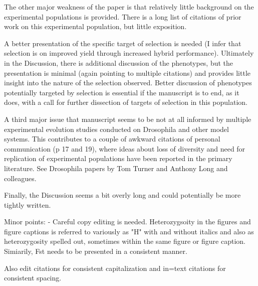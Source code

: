 \documentclass[onecolumn,oneside,letterpaper]{article}
\newcommand{\jri}[1]{\textcolor{red}{ \emph{\scriptsize  #1}} }
\begin{document}
The other major weakness of the paper is that relatively little background on the experimental populations 
is provided. There is a long list of citations of prior work on this experimental population, but little 
exposition.

\response{\jri{Justin? Jode?}}

A better presentation of the specific target of selection is needed (I infer that selection is on 
improved yield through increased hybrid performance). Ultimately in the Discussion, there is additional 
discussion of the phenotypes, but the presentation is minimal (again pointing to multiple citations) and 
provides little insight into the nature of the selection observed. Better discussion of phenotypes potentially 
targeted by selection is essential if the manuscript is to end, as it does, with a call for further dissection of 
targets of selection in this population.

\response{\jri{Jode? Justin?}}

A third major issue that manuscript seems to be not at all informed by multiple experimental evolution 
studies conducted on Drosophila and other model systems. This contributes to a couple of awkward 
citations of personal communication (p 17 and 19), where ideas about loss of diversity and need for 
replication of experimental populations have been reported in the primary literature. See Drosophila papers 
by Tom Turner and Anthony Long and colleagues.


Finally, the Discussion seems a bit overly long and could potentially be more tightly written.


Minor points: 
- Careful copy editing is needed. Heterozygsoity in the figures and figure captions is referred to variously 
as "H" with and without italics and also as heterozygosity spelled out, sometimes within the same figure or 
figure caption. Simiarily, Fst needs to be presented in a consistent manner. 


Also edit citations for consistent capitalization and in=text citations for consistent spacing. 
\end{document}
